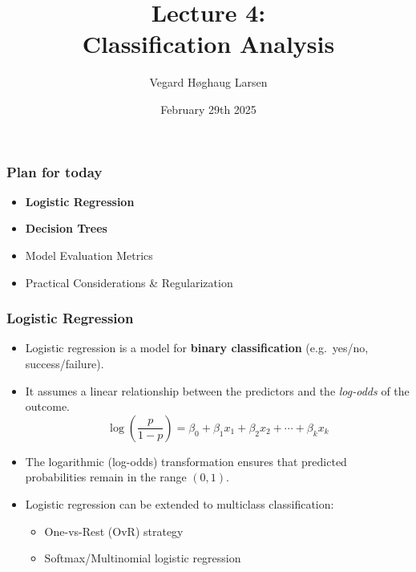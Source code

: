 \documentclass[aspectratio=169]{beamer}
\title{Lecture 4:\\ Classification Analysis}
\institute{GRA4160: Predictive Modelling with Machine Learning}
\date{February 29th 2025}
\author{Vegard H\o ghaug Larsen}
\begin{document}
\maketitle

\begin{frame}
    \frametitle{Plan for today}
    \begin{itemize}
        \item \textbf{Logistic Regression}
        \item \textbf{Decision Trees}
        \item Model Evaluation Metrics
        \item Practical Considerations \& Regularization
    \end{itemize}
\end{frame}

\begin{frame}
    \frametitle{Logistic Regression}
    \begin{itemize}
        \item Logistic regression is a model for \textbf{binary classification} (e.g.\ yes/no, success/failure).
        \pause
        \item It assumes a linear relationship between the predictors and the \emph{log-odds} of the outcome.
        \[
            \log\left(\frac{p}{1-p}\right) = \beta_0 + \beta_1x_1 +\beta_2x_2 + \cdots + \beta_kx_k
        \]
		\pause
        \item The logarithmic (log-odds) transformation ensures that predicted probabilities remain in the range $(0,1)$.
        \pause
        \item Logistic regression can be extended to multiclass classification:
        \begin{itemize}
            \item One-vs-Rest (OvR) strategy
            \item Softmax/Multinomial logistic regression
        \end{itemize}
    \end{itemize}
\end{frame}
\end{document}
